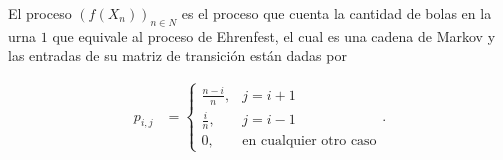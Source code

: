 El proceso $(f(X_n))_{n \in N}$ es el proceso que cuenta la cantidad de bolas en la urna $1$ que equivale al proceso
de Ehrenfest, el cual es una cadena de Markov y las entradas de su matriz de transición están dadas por

\begin{align}
        p_{i,j}     &=  
                        \begin{cases}
                            \frac{n-i}{n},  &   j=i+1   \\
                            \frac{i}{n},    &   j=i-1   \\
                            0,              &   \text{en cualquier otro caso}
                        \end{cases}.
\end{align}

